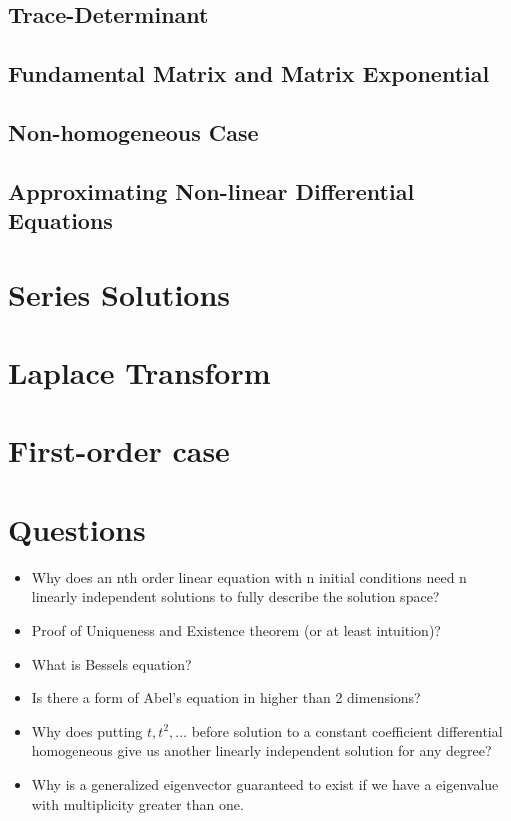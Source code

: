 \documentclass{report}
\begin{document}
\section{Trace-Determinant}





















\section{Fundamental Matrix and Matrix Exponential}
\section{Non-homogeneous Case}
\section{Approximating Non-linear Differential Equations}


\chapter{Series Solutions}

\chapter{Laplace Transform}

\chapter{First-order case}

\chapter{Questions}
\begin{itemize}
    \item Why does an nth order linear equation with n initial conditions need n linearly independent solutions to fully describe the solution space?
    \item Proof of Uniqueness and Existence theorem (or at least intuition)?
    \item What is Bessels equation?
    \item Is there a form of Abel's equation in higher than 2 dimensions?
    \item Why does putting $t, t^2, \dots $ before solution to a constant coefficient differential homogeneous give us another linearly independent solution for any degree?
    \item Why is a generalized eigenvector guaranteed to exist if we have a eigenvalue with multiplicity greater than one.
\end{itemize}
\end{document}
